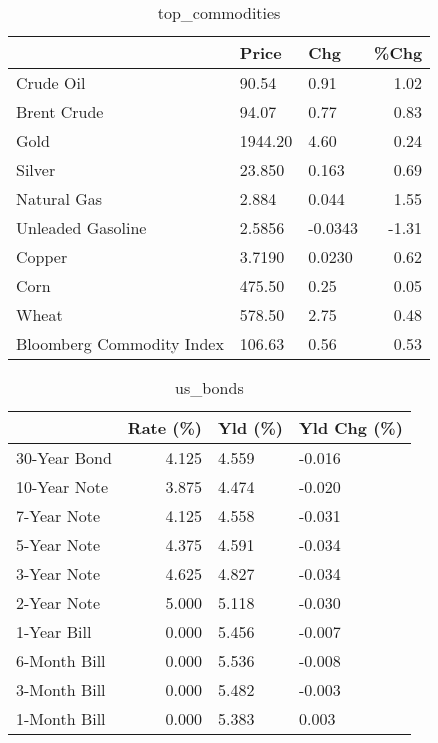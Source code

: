 \documentclass{article}%
\begin{document}
\begin{table}[htbp]%
\caption{top\_commodities}%
\centering%
\begin{adjustbox}{width=1\textwidth}%
\begin{tabular}{lllr}
\toprule
                          &   Price &     Chg &  \%Chg \\
\midrule
               Crude Oil  &   90.54 &    0.91 &  1.02 \\
             Brent Crude  &   94.07 &    0.77 &  0.83 \\
                    Gold  & 1944.20 &    4.60 &  0.24 \\
                  Silver  &  23.850 &   0.163 &  0.69 \\
             Natural Gas  &   2.884 &   0.044 &  1.55 \\
       Unleaded Gasoline  &  2.5856 & -0.0343 & -1.31 \\
                  Copper  &  3.7190 &  0.0230 &  0.62 \\
                    Corn  &  475.50 &    0.25 &  0.05 \\
                   Wheat  &  578.50 &    2.75 &  0.48 \\
Bloomberg Commodity Index &  106.63 &    0.56 &  0.53 \\
\bottomrule
\end{tabular}
%
\end{adjustbox}%
\end{table}

%


\begin{table}[htbp]%
\caption{us\_bonds}%
\centering%
\begin{adjustbox}{width=1\textwidth}%
\begin{tabular}{lrll}
\toprule
             &  Rate (\%) & Yld (\%) & Yld Chg (\%) \\
\midrule
30-Year Bond &     4.125 &   4.559 &      -0.016 \\
10-Year Note &     3.875 &   4.474 &      -0.020 \\
 7-Year Note &     4.125 &   4.558 &      -0.031 \\
 5-Year Note &     4.375 &   4.591 &      -0.034 \\
 3-Year Note &     4.625 &   4.827 &      -0.034 \\
 2-Year Note &     5.000 &   5.118 &      -0.030 \\
 1-Year Bill &     0.000 &   5.456 &      -0.007 \\
6-Month Bill &     0.000 &   5.536 &      -0.008 \\
3-Month Bill &     0.000 &   5.482 &      -0.003 \\
1-Month Bill &     0.000 &   5.383 &       0.003 \\
\bottomrule
\end{tabular}
%
\end{adjustbox}%
\end{table}
\end{document}
